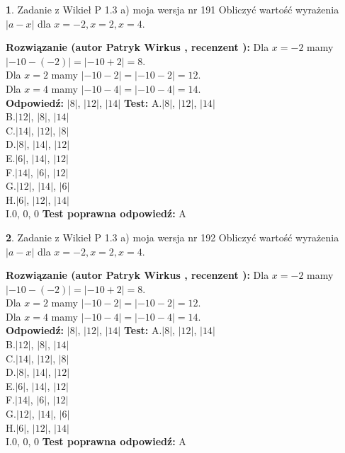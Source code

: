 \documentclass[12pt, a4paper]{article}
\theoremstyle{definition} %
\newtheorem{zad}{}
\newcommand{\zadStart}[1]{\begin{zad}#1\newline}
\newcommand{\zadStop}{\end{zad}}
\newcommand{\rozwStart}[2]{\noindent \textbf{Rozwiązanie (autor #1 , recenzent #2): }\newline}
\newcommand{\rozwStop}{\newline}
\newcommand{\odpStart}{\noindent \textbf{Odpowiedź:}\newline}
\newcommand{\odpStop}{\newline}
\newcommand{\testStart}{\noindent \textbf{Test:}\newline}
\newcommand{\testStop}{\newline}
\newcommand{\kluczStart}{\noindent \textbf{Test poprawna odpowiedź:}\newline}
\newcommand{\kluczStop}{\newline}
\begin{document}
\zadStart{Zadanie z Wikieł P 1.3 a) moja wersja nr 191}
Obliczyć wartość wyrażenia $|a - x|$ dla $x=-2,x=2,x=4$.
\zadStop
\rozwStart{Patryk Wirkus}{}
Dla $x = -2$ mamy $|-10 - (-2)| = |-10 + 2| = 8$.\\
Dla $x = 2$ mamy $|-10 - 2| = |-10 - 2| = 12$.\\
Dla $x = 4$ mamy $|-10 - 4| = |-10 - 4| = 14$.\\
\rozwStop
\odpStart
$|8|$, $|12|$, $|14|$
\odpStop
\testStart
A.$|8|$, $|12|$, $|14|$\\
B.$|12|$, $|8|$, $|14|$\\
C.$|14|$, $|12|$, $|8|$\\
D.$|8|$, $|14|$, $|12|$\\
E.$|6|$, $|14|$, $|12|$\\
F.$|14|$, $|6|$, $|12|$\\
G.$|12|$, $|14|$, $|6|$\\
H.$|6|$, $|12|$, $|14|$\\
I.$0$, $0$, $0$
\testStop
\kluczStart
A
\kluczStop



\zadStart{Zadanie z Wikieł P 1.3 a) moja wersja nr 192}
Obliczyć wartość wyrażenia $|a - x|$ dla $x=-2,x=2,x=4$.
\zadStop
\rozwStart{Patryk Wirkus}{}
Dla $x = -2$ mamy $|-10 - (-2)| = |-10 + 2| = 8$.\\
Dla $x = 2$ mamy $|-10 - 2| = |-10 - 2| = 12$.\\
Dla $x = 4$ mamy $|-10 - 4| = |-10 - 4| = 14$.\\
\rozwStop
\odpStart
$|8|$, $|12|$, $|14|$
\odpStop
\testStart
A.$|8|$, $|12|$, $|14|$\\
B.$|12|$, $|8|$, $|14|$\\
C.$|14|$, $|12|$, $|8|$\\
D.$|8|$, $|14|$, $|12|$\\
E.$|6|$, $|14|$, $|12|$\\
F.$|14|$, $|6|$, $|12|$\\
G.$|12|$, $|14|$, $|6|$\\
H.$|6|$, $|12|$, $|14|$\\
I.$0$, $0$, $0$
\testStop
\kluczStart
A
\kluczStop
\end{document}
